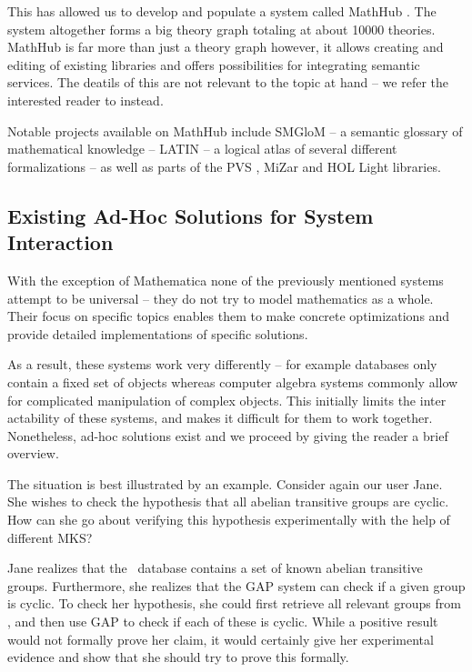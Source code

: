 This has allowed us to develop and populate a system called MathHub \cite{MathHub:on}. 
The system altogether forms a big theory graph totaling at about 10000 theories. 
MathHub is far more than just a theory graph however, it allows creating and editing of existing libraries and offers possibilities for integrating semantic services.
The deatils of this are not relevant to the topic at hand -- we refer the interested reader to \cite{Iancu:phd} instead.

Notable projects available on MathHub include SMGloM \cite{SMGloM:on} -- a semantic glossary of mathematical knowledge -- LATIN \cite{LATIN:online} -- a logical atlas of several different formalizations  -- as well as parts of the PVS \cite{PVSlibraries:on}, MiZar \cite{mizar:online} and HOL Light \cite{KalRab:hollight:14} libraries.

\subsection{Existing Ad-Hoc Solutions for System Interaction}\label{sec:intro:interact}

With the exception of Mathematica none of the previously mentioned systems attempt to be universal -- they do not try to model mathematics as a whole. 
Their focus on specific topics enables them to make concrete optimizations and provide detailed implementations of specific solutions. 

As a result, these systems work very differently -- for example databases only contain a fixed set of objects whereas computer algebra systems commonly allow for complicated manipulation of complex objects. 
This initially limits the inter actability of these systems, and makes it difficult for them to work together. 
Nonetheless, ad-hoc solutions exist and we proceed by giving the reader a brief overview. 

The situation is best illustrated by an example. 
Consider again our user Jane. 
She wishes to check the hypothesis that all abelian transitive groups are cyclic.
How can she go about verifying this hypothesis experimentally with the help of different MKS?

Jane realizes that the \lmfdb\ database contains a set of known abelian transitive groups. 
Furthermore, she realizes that the GAP system can check if a given group is cyclic. 
To check her hypothesis, she could first retrieve all relevant groups from \lmfdb, and then use GAP to check if each of these is cyclic. 
While a positive result would not formally prove her claim, it would certainly give her experimental evidence and show that she should try to prove this formally. 

